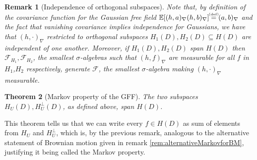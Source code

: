 \documentclass[11pt,reqno]{amsart}
\numberwithin{equation}{section}
\newtheorem{thm}{Theorem}[section]
\newtheorem{rem}[thm]{Remark}
\newcommand{\eqbydef}{\mathrel{\stackrel{\hspace*{-3mm}\text{\tiny(def)}\hspace*{-3mm}}{=}}}
\begin{document}
\begin{rem}[Independence of orthogonal subspaces]
	Note that, by definition of the covariance function for the Gaussian free field $\mathbb E[(h,a)_\nabla(h,b)_\nabla]\eqbydef(a,b)_\nabla$ and the fact that vanishing covariance implies independence for Gaussians, we have that $(h,\cdot)_\nabla$ restricted to orthogonal subspaces $H_1(D),H_2(D)\subseteq H(D)$ are independent of one another. Moreover, if $H_1(D),H_2(D)$ span $H(D)$ then $\mathcal F_{H_1},\mathcal F_{H_2}$, the smallest $\sigma$-algebras such that $(h,f)_\nabla$ are measurable for all $f$ in $H_1$,$H_2$ respectively, generate $\mathcal F$, the smallest $\sigma$-algebra making $(h,\cdot)_\nabla$ measurable. 
\end{rem}

\begin{thm}[Markov property of the GFF]\label{thm:MarkovProperty}
	The two subspaces $H_U(D), H_U^\perp(D)$, as defined above, span $H(D)$.
\end{thm}

This theorem tells us that we can write every $f\in H(D)$ as sum of elements from $H_U$ and $H_U^\perp$, which is, by the previous remark, analogous to the alternative statement of Brownian motion given in remark \ref{rem:alternativeMarkovforBM}, justifying it being called the Markov property.
\end{document}
